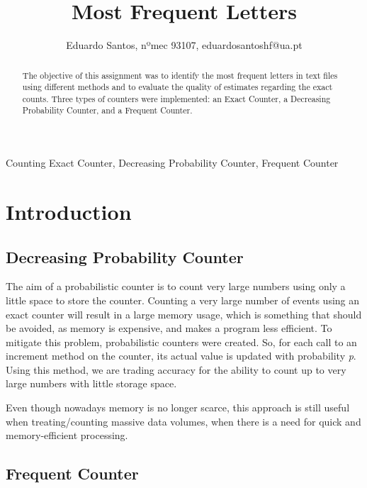 \documentclass[...]{revdetua}
\begin{document}

\title{Most Frequent Letters}
\author{Eduardo Santos, nºmec 93107, eduardosantoshf@ua.pt} %
\maketitle

\begin{abstract}
The objective of this assignment was to identify the most frequent letters in text files  using different methods and to evaluate the quality of estimates regarding the exact counts. Three types of counters were implemented: an Exact Counter, a Decreasing Probability Counter, and a Frequent Counter. 
\end{abstract}

\begin{keywords}{Counting Exact Counter, Decreasing Probability Counter, Frequent Counter}
\end{keywords}

\section{Introduction}

\subsection{Decreasing Probability Counter}

The aim of a probabilistic counter is to count very large numbers using only a little space to store the counter. Counting a very large number of events using an exact counter will result in a large memory usage, which is something that should be avoided, as memory is expensive, and makes a program less efficient. To mitigate this problem, probabilistic counters were created. So, for each call to an increment method on the counter, its actual value is updated with probability \textit{p}. Using this method, we are trading accuracy for the ability to count up to very large numbers with little storage space.

Even though nowadays memory is no longer scarce, this approach is still useful when treating/counting massive data volumes, when there is a need for quick and memory-efficient processing.

\subsection{Frequent Counter}
\end{document}
